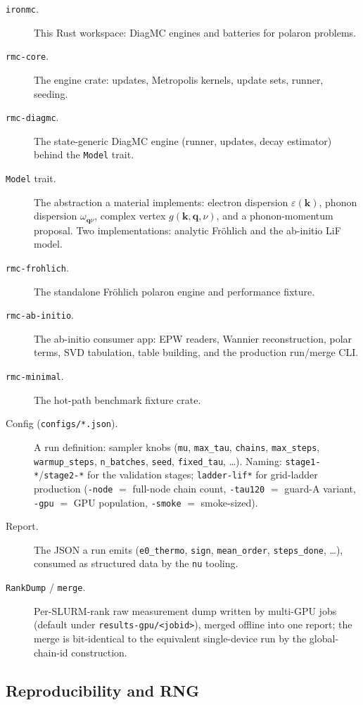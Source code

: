 \documentclass[11pt]{article}
\newcommand{\kv}{\mathbf{k}}
\newcommand{\qv}{\mathbf{q}}
\newcommand{\term}[1]{\item[#1.]}
\begin{document}
\begin{description}
\term{\texttt{ironmc}} This Rust workspace: DiagMC engines and batteries for polaron
  problems.

\term{\texttt{rmc-core}} The engine crate: updates, Metropolis kernels, update sets,
  runner, seeding.

\term{\texttt{rmc-diagmc}} The state-generic DiagMC engine (runner, updates, decay
  estimator) behind the \texttt{Model} trait.

\term{\texttt{Model} trait} The abstraction a material implements: electron
  dispersion $\varepsilon(\kv)$, phonon dispersion $\omega_{\qv\nu}$, complex vertex
  $g(\kv,\qv,\nu)$, and a phonon-momentum proposal. Two implementations: analytic
  Fr\"ohlich and the ab-initio LiF model.

\term{\texttt{rmc-frohlich}} The standalone Fr\"ohlich polaron engine and performance
  fixture.

\term{\texttt{rmc-ab-initio}} The ab-initio consumer app: EPW readers, Wannier
  reconstruction, polar terms, SVD tabulation, table building, and the production
  run/merge CLI.

\term{\texttt{rmc-minimal}} The hot-path benchmark fixture crate.

\term{Config (\texttt{configs/*.json})} A run definition: sampler knobs
  (\texttt{mu}, \texttt{max\_tau}, \texttt{chains}, \texttt{max\_steps},
  \texttt{warmup\_steps}, \texttt{n\_batches}, \texttt{seed},
  \texttt{fixed\_tau}, \dots). Naming: \texttt{stage1-*}/\texttt{stage2-*} for the
  validation stages; \texttt{ladder-lif*} for grid-ladder production
  (\texttt{-node} $=$ full-node chain count, \texttt{-tau120} $=$ guard-A variant,
  \texttt{-gpu} $=$ GPU population, \texttt{-smoke} $=$ smoke-sized).

\term{Report} The JSON a run emits (\texttt{e0\_thermo}, \texttt{sign},
  \texttt{mean\_order}, \texttt{steps\_done}, \dots), consumed as structured data by
  the \texttt{nu} tooling.

\term{\texttt{RankDump} / \texttt{merge}} Per-SLURM-rank raw measurement dump written
  by multi-GPU jobs (default under \texttt{results-gpu/<jobid>}), merged offline into
  one report; the merge is bit-identical to the equivalent single-device run by the
  global-chain-id construction.
\end{description}

\subsection{Reproducibility and RNG}
\end{document}
